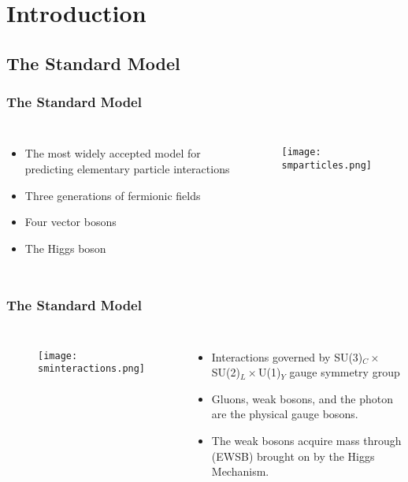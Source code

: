 \section{Introduction}

\subsection{The Standard Model}

\begin{frame}
\frametitle{The Standard Model}
\begin{columns}
\begin{itemize}
    \item The most widely accepted model for predicting elementary
        particle interactions
    \item Three generations of fermionic fields
    \item Four vector bosons
    \item The Higgs boson
\end{itemize}
\begin{figure}
\centering
\texttt{[image: smparticles.png]}
\end{figure}
\end{columns}
\end{frame}

\begin{frame}[label=sm2]
\frametitle{The Standard Model}
\begin{columns}
\begin{figure}
\centering
\texttt{[image: sminteractions.png]}
\end{figure}
\begin{itemize}
    \item Interactions governed by SU(3)$_{C} \times$SU(2)$_L
        \times$U(1)$_Y$ gauge symmetry group
    \item Gluons, weak bosons, and the photon are the physical gauge
        bosons.
    \item The weak bosons acquire mass through
        (EWSB)
        brought on by the Higgs Mechanism.
\end{itemize}
\end{columns}
\end{frame}

